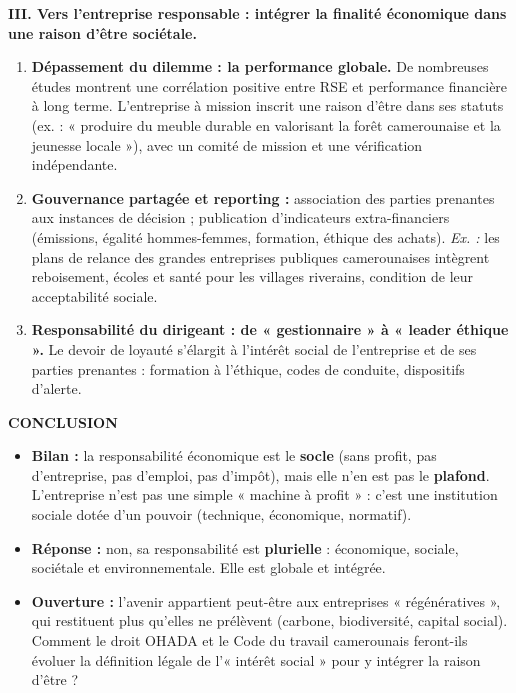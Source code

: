 \documentclass[11pt]{article}
\newcommand{\cle}[1]{{\popxbold\color{popdark}#1}}
\begin{document}
\begin{exoresolu}
    \textbf{III. Vers l'entreprise responsable : intégrer la finalité économique dans une raison d'être sociétale.}
    \begin{enumerate}
        \item \textbf{Dépassement du dilemme : la performance globale.} De nombreuses études montrent une corrélation positive entre RSE et performance financière à long terme. L'\cle{entreprise à mission} inscrit une \cle{raison d'être} dans ses statuts (ex. : « produire du meuble durable en valorisant la forêt camerounaise et la jeunesse locale »), avec un comité de mission et une vérification indépendante.
        \item \textbf{Gouvernance partagée et reporting :} association des parties prenantes aux instances de décision ; publication d'indicateurs extra-financiers (émissions, égalité hommes-femmes, formation, éthique des achats). \emph{Ex. :} les plans de relance des grandes entreprises publiques camerounaises intègrent reboisement, écoles et santé pour les villages riverains, condition de leur acceptabilité sociale.
        \item \textbf{Responsabilité du dirigeant : de « gestionnaire » à « leader éthique ».} Le devoir de loyauté s'élargit à l'intérêt social de l'entreprise et de ses parties prenantes : formation à l'éthique, codes de conduite, dispositifs d'alerte.
    \end{enumerate}

    \textbf{CONCLUSION}
    \begin{itemize}
        \item \textbf{Bilan :} la responsabilité économique est le \textbf{socle} (sans profit, pas d'entreprise, pas d'emploi, pas d'impôt), mais elle n'en est pas le \textbf{plafond}. L'entreprise n'est pas une simple « machine à profit » : c'est une \cle{institution sociale} dotée d'un pouvoir (technique, économique, normatif).
        \item \textbf{Réponse :} non, sa responsabilité est \textbf{plurielle} : économique, sociale, sociétale et environnementale. Elle est \cle{globale} et \cle{intégrée}.
        \item \textbf{Ouverture :} l'avenir appartient peut-être aux entreprises « régénératives », qui restituent plus qu'elles ne prélèvent (carbone, biodiversité, capital social). Comment le droit OHADA et le Code du travail camerounais feront-ils évoluer la définition légale de l'« intérêt social » pour y intégrer la \cle{raison d'être} ?
    \end{itemize}
\end{exoresolu}
\end{document}
